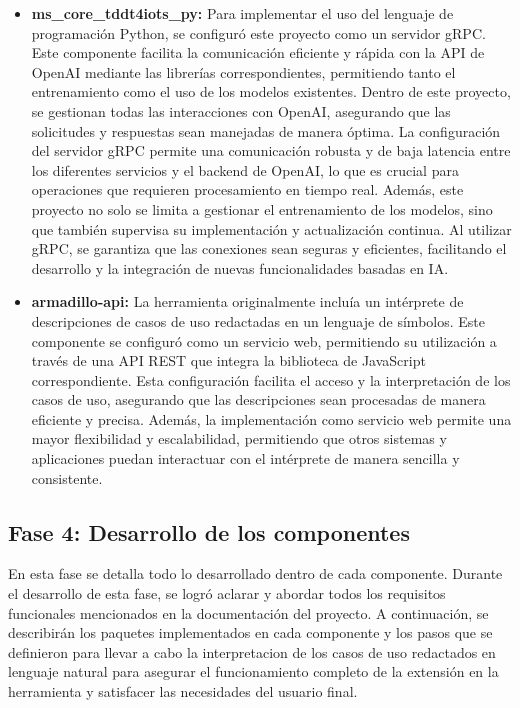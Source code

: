 \begin{itemize}
	\item \textbf{ms\_core\_tddt4iots\_py: } Para implementar el uso del lenguaje de programación Python, se configuró este proyecto como un servidor gRPC. Este componente facilita la comunicación eficiente y rápida con la API de OpenAI mediante las librerías correspondientes, permitiendo tanto el entrenamiento como el uso de los modelos existentes. Dentro de este proyecto, se gestionan todas las interacciones con OpenAI, asegurando que las solicitudes y respuestas sean manejadas de manera óptima. La configuración del servidor gRPC permite una comunicación robusta y de baja latencia entre los diferentes servicios y el backend de OpenAI, lo que es crucial para operaciones que requieren procesamiento en tiempo real. Además, este proyecto no solo se limita a gestionar el entrenamiento de los modelos, sino que también supervisa su implementación y actualización continua. Al utilizar gRPC, se garantiza que las conexiones sean seguras y eficientes, facilitando el desarrollo y la integración de nuevas funcionalidades basadas en IA.
	
	\item \textbf{armadillo-api: } La herramienta originalmente incluía un intérprete de descripciones de casos de uso redactadas en un lenguaje de símbolos. Este componente se configuró como un servicio web, permitiendo su utilización a través de una API REST que integra la biblioteca de JavaScript correspondiente. Esta configuración facilita el acceso y la interpretación de los casos de uso, asegurando que las descripciones sean procesadas de manera eficiente y precisa. Además, la implementación como servicio web permite una mayor flexibilidad y escalabilidad, permitiendo que otros sistemas y aplicaciones puedan interactuar con el intérprete de manera sencilla y consistente.

\end{itemize}

\subsection{Fase 4: Desarrollo de los componentes}

En esta fase se detalla todo lo desarrollado dentro de cada componente. Durante el desarrollo de esta fase, se logró aclarar y abordar todos los requisitos funcionales mencionados en la documentación del proyecto. A continuación, se describirán los paquetes implementados en cada componente y los pasos que se definieron para llevar a cabo la interpretacion de los casos de uso redactados en lenguaje natural para asegurar el funcionamiento completo de la extensión en la herramienta y satisfacer las necesidades del usuario final.

